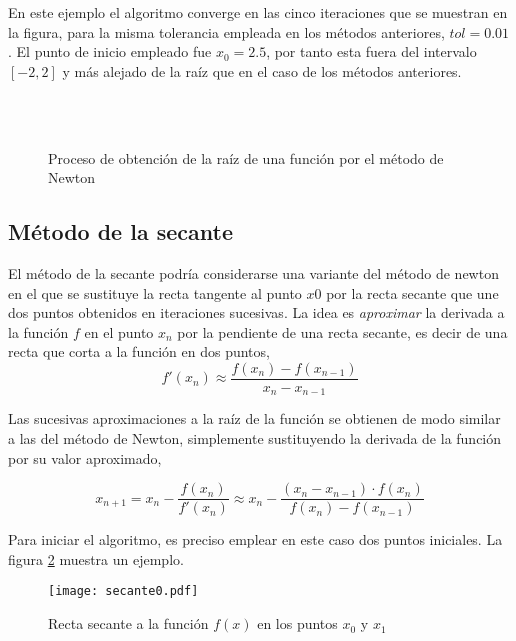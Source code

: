 En este ejemplo el algoritmo converge en las cinco iteraciones que se muestran en la figura, para la misma tolerancia empleada en los métodos anteriores, $tol=0.01$. El punto de inicio empleado fue $x_0=2.5$, por tanto esta fuera del intervalo $[-2, 2]$ y más alejado de la raíz que en el caso de los métodos anteriores.   

\begin{figure}
\centering
{} \qquad
{}\\
\qquad
{}\\
\qquad
{}

\caption{Proceso de obtención de la raíz de una función por el método de Newton}
\label{fig:newton2}
\end{figure}
\subsection{Método de la secante}
El método de la secante podría considerarse una variante del método de newton en el que se sustituye la recta tangente al punto $x0$ por la recta secante que une dos puntos obtenidos en iteraciones sucesivas. La idea es \emph{aproximar} la derivada a la función $f$ en el punto $x_n$ por la pendiente de una recta secante, es decir de una recta que corta a la función en dos puntos, 
\begin{equation*}
f'(x_n)\approx \frac{f(x_n)-f(x_{n-1})}{x_n-x_{n-1}}
\end{equation*}

Las sucesivas aproximaciones a la raíz de la función se obtienen de modo similar a las del método de Newton, simplemente sustituyendo la derivada de la función por su valor aproximado,

\begin{equation*}
x_{n+1}=x_n-\frac{f(x_n)}{f'(x_n)}\approx x_n-\frac{(x_n-x_{n-1})\cdot f(x_n)}{f(x_n)-f(x_{n-1})}
\end{equation*}

Para iniciar el algoritmo, es preciso emplear en este caso dos puntos iniciales. La figura \ref{fig:secante} muestra un ejemplo.

\begin{figure}[h]
\texttt{[image: secante0.pdf]}
\caption{Recta secante a la  función $f(x)$ en los puntos $x_0$ y $x_1$}
\label{fig:secante}
\end{figure}

